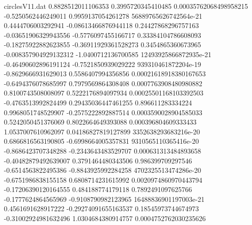 \begin{filecontents}{circlesV11.dat}
0.8828512011106353	0.3995720345410485	0.00035762068498958215
-0.5250562446249011	0.9959137054261278	56889765626742564e-21
0.4444706003292941	-0.08613466876944118	0.24427868296757163
-0.03651906329943556	-0.5776097455166717	0.33384104786608093
-0.18275922882623855	-0.36911929361528273	0.3454865360673965
-0.008357904929132312	-1.0400712136700585	12493925866872935e-21
-0.46490602896191124	-0.7521850939029222	939310461872204e-19
-0.8629666931629013	0.5586407994356856	0.00021618918380167653
-0.6494376078685997	0.7979569864308408	0.0007763908480980882
0.8100743508008097	0.5222176894097934	0.00025501168103392503
-0.4763513992824499	0.29435036447461255	0.896611283334224
0.9968051748529907	-0.2575222892887514	0.0003590028904585033
0.5242050451376069	0.8022664649393088	0.000396804609333433
1.0537007610962097	0.04186827819127899	3352638293683216e-20
0.6866816563190805	-0.6998664005357831	9310565110365416e-20
-0.8686423707348288	-0.2343643483529707	0.000631313484893658
-0.40482879492639007	0.3791464480343506	0.986399709297546
-0.6514563822495386	-0.8843925992284258	4702325513474286e-20
-0.6751986838155158	0.6808714231615992	0.0020974860970443794
-0.17206390120164555	0.484188774179118	0.7892491097625766
-0.1777624864565969	-0.9108790982123965	16488836901197003e-21
0.4561691628917222	-0.29274091655163537	0.18545973744674973
-0.31002924981632496	1.0304684380914757	0.0004752762030235626
\end{filecontents}
